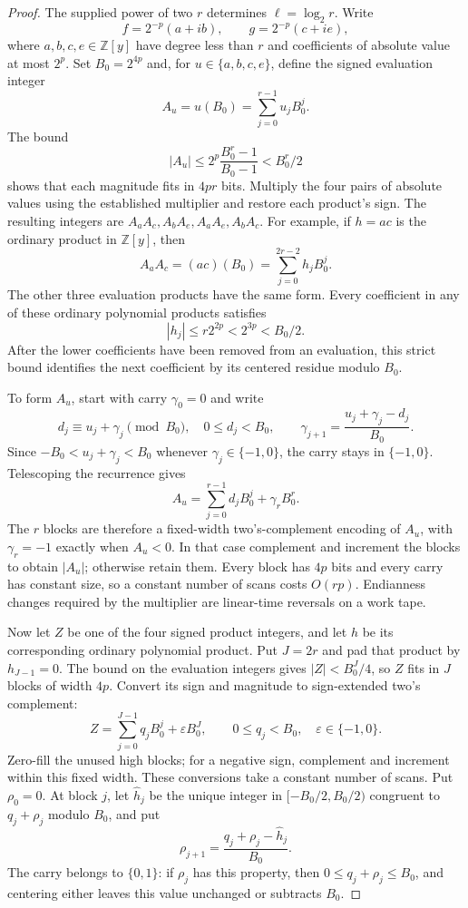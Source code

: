 \documentclass[11pt]{article}
\theoremstyle{definition}
\begin{document}
\begin{proof}
The supplied power of two $r$ determines $\ell=\log_2r$.
Write
\[
 f=2^{-p}(a+ib),\qquad g=2^{-p}(c+ie),
\]
where $a,b,c,e\in\mathbb Z[y]$ have degree less than $r$ and
coefficients of absolute value at most $2^p$.  Set $B_0=2^{4p}$
and, for $u\in\{a,b,c,e\}$, define the signed evaluation integer
\[
       A_u=u(B_0)=\sum_{j=0}^{r-1}u_jB_0^j.
\]
The bound
\[
 |A_u|\leq2^p\frac{B_0^r-1}{B_0-1}<B_0^r/2
\]
shows that each magnitude fits in $4pr$ bits.  Multiply the four
pairs of absolute values using the established multiplier and restore
each product's sign.  The resulting integers are
$A_aA_c,A_bA_e,A_aA_e,A_bA_c$.  For example, if
$h=ac$ is the ordinary product in $\mathbb Z[y]$, then
\[
       A_aA_c=(ac)(B_0)=\sum_{j=0}^{2r-2}h_jB_0^j.
\]
The other three evaluation products have the same form.  Every
coefficient in any of these ordinary polynomial products satisfies
\begin{equation}
      |h_j|\leq r2^{2p}<2^{3p}<B_0/2.
 \label{eq:packing-separation}
\end{equation}
After the lower coefficients have been removed from an evaluation,
this strict bound identifies the next coefficient by its centered
residue modulo $B_0$.

To form $A_u$, start with carry $\gamma_0=0$ and write
\[
 d_j\equiv u_j+\gamma_j\pmod{B_0},\quad 0\leq d_j<B_0,
 \qquad \gamma_{j+1}=\frac{u_j+\gamma_j-d_j}{B_0}.
\]
Since $-B_0<u_j+\gamma_j<B_0$ whenever
$\gamma_j\in\{-1,0\}$, the carry stays in $\{-1,0\}$.  Telescoping
the recurrence gives
\[
       A_u=\sum_{j=0}^{r-1}d_jB_0^j+\gamma_rB_0^r.
\]
The $r$ blocks are therefore a fixed-width two's-complement encoding
of $A_u$, with $\gamma_r=-1$ exactly when $A_u<0$.  In that case
complement and increment the blocks to obtain $|A_u|$; otherwise
retain them.  Every block has $4p$ bits and every carry has constant
size, so a constant number of scans costs $O(rp)$.  Endianness
changes required by the multiplier are linear-time reversals on a
work tape.

Now let $Z$ be one of the four signed product integers, and let $h$
be its corresponding ordinary polynomial product.  Put $J=2r$ and
pad that product by $h_{J-1}=0$.  The bound on the evaluation integers
gives $|Z|<B_0^J/4$, so $Z$ fits in $J$ blocks of width $4p$.
Convert its sign and magnitude to sign-extended two's complement:
\[
 Z=\sum_{j=0}^{J-1}q_jB_0^j+\varepsilon B_0^J,
 \qquad 0\leq q_j<B_0,\quad \varepsilon\in\{-1,0\}.
\]
Zero-fill the unused high blocks; for a negative sign, complement
and increment within this fixed width.  These conversions take a
constant number of scans.
Put $\rho_0=0$.  At block $j$, let $\widehat h_j$ be the unique
integer in $[-B_0/2,B_0/2)$ congruent to $q_j+\rho_j$ modulo $B_0$,
and put
\[
       \rho_{j+1}=
          \frac{q_j+\rho_j-\widehat h_j}{B_0}.
\]
The carry belongs to $\{0,1\}$: if $\rho_j$ has this property, then
$0\leq q_j+\rho_j\leq B_0$, and centering either leaves this value
unchanged or subtracts $B_0$.


\end{proof}
\end{document}
